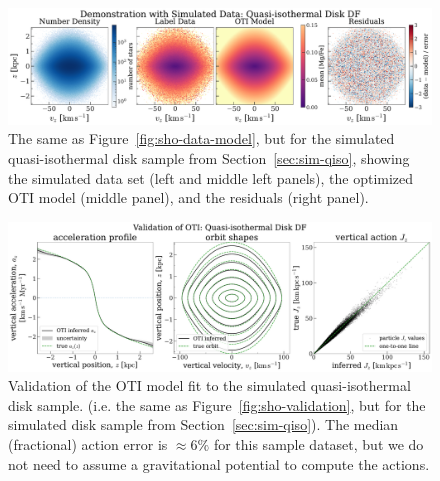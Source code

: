 \begin{figure}[t!]
\begin{center}
\includegraphics[width=\textwidth]{qiso-data-model.pdf}
\end{center}
\caption{%
The same as Figure~\ref{fig:sho-data-model}, but for the simulated quasi-isothermal disk
sample from Section~\ref{sec:sim-qiso}, showing the simulated data set (left and middle
left panels), the optimized OTI model (middle panel), and the residuals (right panel).
\label{fig:qiso-data-model}
}
\end{figure}

\begin{figure}[t!]
\begin{center}
\includegraphics[width=\textwidth]{qiso-validation.pdf}
\end{center}
\caption{%
Validation of the OTI model fit to the simulated quasi-isothermal disk sample. (i.e. the
same as Figure~\ref{fig:sho-validation}, but for the simulated disk sample from
Section~\ref{sec:sim-qiso}).
The median (fractional) action error is $\approx 6\%$ for this sample dataset, but we do
not need to assume a gravitational potential to compute the actions.
\label{fig:qiso-validation}
}
\end{figure}

